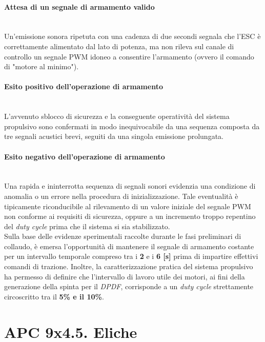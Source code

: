 \documentclass[11pt]{report}
\begin{document}
	\paragraph{Attesa di un segnale di armamento valido}\mbox{}\\
	Un'emissione sonora ripetuta con una cadenza di due secondi segnala che l'ESC è correttamente alimentato dal lato di potenza, ma non rileva sul canale di controllo un segnale PWM idoneo a consentire l'armamento (ovvero il comando di "motore al minimo").
	
	\paragraph{Esito positivo dell'operazione di armamento}\mbox{}\\
	L'avvenuto sblocco di sicurezza e la conseguente operatività del sistema propulsivo sono confermati in modo inequivocabile da una sequenza composta da tre segnali acustici brevi, seguiti da una singola emissione prolungata.
	
	\paragraph{Esito negativo dell'operazione di armamento}\mbox{}\\
	Una rapida e ininterrotta sequenza di segnali sonori evidenzia una condizione di anomalia o un errore nella procedura di inizializzazione. Tale eventualità è tipicamente riconducibile al rilevamento di un valore iniziale del segnale PWM non conforme ai requisiti di sicurezza, oppure a un incremento troppo repentino del \textit{duty cycle} prima che il sistema si sia stabilizzato.\\
	
	Sulla base delle evidenze sperimentali raccolte durante le fasi preliminari di collaudo, è emersa l'opportunità di mantenere il segnale di armamento costante per un intervallo temporale compreso tra i \textbf{2} e i \textbf{6 [s]} prima di impartire effettivi comandi di trazione. Inoltre, la caratterizzazione pratica del sistema propulsivo ha permesso di definire che l'intervallo di lavoro utile dei motori, ai fini della generazione della spinta per il \textit{DPDF}, corrisponde a un \textit{duty cycle} strettamente circoscritto tra il \textbf{5\% e il 10\%}.
	
	\section{APC 9x4.5. Eliche}
	
\end{document}
